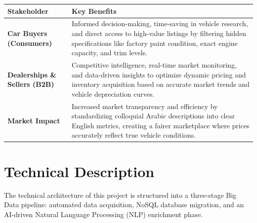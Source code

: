 \documentclass[12pt]{article}
\begin{document}
\vspace{0.5cm}
\noindent
\renewcommand{\arraystretch}{1.5} 
\begin{tabularx}{\textwidth}{|>{\raggedright\arraybackslash}p{4.5cm}|X|}
    \hline
    \textbf{Stakeholder} & \textbf{Key Benefits} \\
    \hline
    \textbf{Car Buyers \newline (Consumers)} & Informed decision-making, time-saving in vehicle research, and direct access to high-value listings by filtering hidden specifications like factory paint condition, exact engine capacity, and trim levels. \\
    \hline
    \textbf{Dealerships \& Sellers \newline (B2B)} & Competitive intelligence, real-time market monitoring, and data-driven insights to optimize dynamic pricing and inventory acquisition based on accurate market trends and vehicle depreciation curves. \\
    \hline
    \textbf{Market Impact} & Increased market transparency and efficiency by standardizing colloquial Arabic descriptions into clear English metrics, creating a fairer marketplace where prices accurately reflect true vehicle conditions. \\
    \hline
\end{tabularx}

\newpage
\section{Technical Description}

The technical architecture of this project is structured into a three-stage Big Data pipeline: automated data acquisition, NoSQL database migration, and an AI-driven Natural Language Processing (NLP) enrichment phase.
\end{document}
